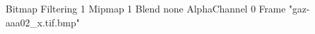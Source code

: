 {Bitmap
	{Filtering 1}
	{Mipmap 1}
	{Blend none}
	{AlphaChannel 0}
	{Frame "gaz-aaa02_x.tif.bmp"}
}
